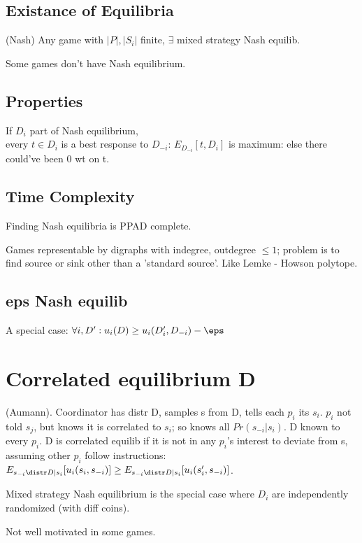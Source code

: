 \documentclass[oneside, article]{memoir}
\begin{document}
\subsection{Existance of Equilibria}
(Nash) Any game with $|P|, |S_{i}|$ finite, $\exists$ mixed strategy Nash equilib. \why

Some games don't have Nash equilibrium.

\subsection{Properties}
If $D_{i}$ part of Nash equilibrium,\\
 every $t \in D_{i}$ is a best response to $D_{-i}$: $E_{D_{-i}}[t, D_{i}]$ is maximum: else there could've been 0 wt on t.

\subsection{Time Complexity}
Finding Nash equilibria is PPAD complete.

Games representable by digraphs with indegree, outdegree $\leq 1$; problem is to find source or sink other than a 'standard source'. Like Lemke - Howson polytope.

\tbc

\subsection{eps Nash equilib}
A special case: $\forall i, D': u_{i}(D) \geq u_{i}(D'_{i}, D_{-i}) - \eps$

\section{Correlated equilibrium D}
(Aumann). Coordinator has distr D, samples s from D, tells each $p_{i}$ its $s_{i}$. $p_{i}$ not told $s_{j}$, but knows it is correlated to $s_{i}$; so knows all $Pr(s_{-i}|s_{i})$. D known to every $p_{i}$. D is correlated equilib if it is not in any $p_{i}$'s interest to deviate from s, assuming other $p_{i}$ follow instructions: \\
$E_{s_{-i} \distr D|s_{i}} [u_{i}(s_{i}, s_{-i})] \geq E_{s_{-i}\distr D|s_{i}} [u_{i}(s'_{i}, s_{-i})] $.

Mixed strategy Nash equilibrium is the special case where $D_{i}$ are independently randomized (with diff coins).

Not well motivated in some games.
\end{document}
